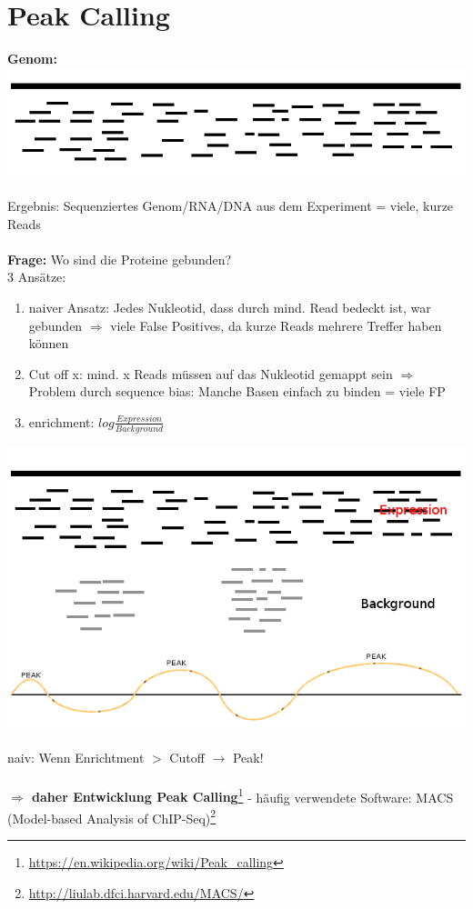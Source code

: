 \section{Peak Calling}
\textbf{Genom:}\\
\includegraphics[scale=0.5]{lectures/160415/pix/Peak1.png}
\\\\
Ergebnis: Sequenziertes Genom/RNA/DNA aus dem Experiment = viele, kurze Reads\\\\
\textbf{Frage:} Wo sind die Proteine gebunden?\\

3 Ansätze:
\begin{enumerate}
	\item naiver Ansatz: Jedes Nukleotid, dass durch mind. Read bedeckt ist, war gebunden $\Rightarrow$ viele False Positives, da kurze Reads mehrere Treffer haben können
	\item Cut off x: mind. x Reads müssen auf das Nukleotid gemappt sein $\Rightarrow$ Problem durch sequence bias: Manche Basen einfach zu binden = viele FP
	\item enrichment: $log\frac{Expression}{Background}$
\end{enumerate}

\includegraphics[scale=0.5]{lectures/160415/pix/Peak3.png}

naiv: Wenn Enrichtment $>$ Cutoff $\rightarrow$ Peak!
\\\\
\textbf{$\Rightarrow$ daher Entwicklung Peak Calling}\footnote{\url{https://en.wikipedia.org/wiki/Peak_calling}}
 - häufig verwendete Software: MACS (Model-based Analysis of ChIP-Seq)\footnote{\url{http://liulab.dfci.harvard.edu/MACS/}}


